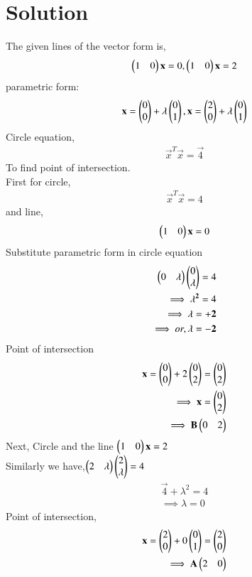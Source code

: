 \documentclass[journal,12pt,twocolumn]{IEEEtran}
\begin{document}
\section{Solution}
The given lines of the vector form is,
\begin{align}
\begin{pmatrix}1 & 0\end{pmatrix}\mathbf{x}=0,\begin{pmatrix}1 & 0\end{pmatrix}\mathbf{x}=2
\end{align}
parametric form:
\begin{align}
\mathbf{x}=\begin{pmatrix}0\\0\end{pmatrix}+\lambda \begin{pmatrix}0\\1\end{pmatrix},\mathbf{x}=\begin{pmatrix}2\\0\end{pmatrix}+\lambda \begin{pmatrix}0\\1\end{pmatrix}
\end{align}
Circle equation,
\begin{align}
\vec{x}^T\vec{x} = \vec{4}
\end{align}
To find point of intersection.
\\
First for circle,
\begin{align}
\vec{x}^T\vec{x}=4 
\end{align}
and line,
\begin{align}
\begin{pmatrix}1 & 0\end{pmatrix}\mathbf{x}=0
\end{align}
Substitute parametric form in circle equation
\begin{align}
\begin{pmatrix}0 & \lambda\end{pmatrix}\begin{pmatrix}0 \\ \lambda\end{pmatrix} =4
\\
\implies \mathbf{\lambda^2}=4
\\
\implies \mathbf{\lambda}=+\mathbf{2} 
\\
\implies or, \mathbf{\lambda}=-\mathbf{2}
\end{align}
 Point of intersection
\begin{align}
\mathbf{x}=\begin{pmatrix}0 \\0\end{pmatrix}+2\begin{pmatrix}0\\ 2\end{pmatrix}=\begin{pmatrix}0 \\ 2\end{pmatrix}
\\ 
\implies\mathbf{x}=\begin{pmatrix}0\\2\end{pmatrix}
\\
\implies \mathbf{B}\begin{pmatrix}0 & 2\end{pmatrix}
\end{align}
Next, Circle and the line $\begin{pmatrix}1 & 0\end{pmatrix}\mathbf{x}=2$
\\
Similarly we have,$\begin{pmatrix}2 & \lambda\end{pmatrix}\begin{pmatrix}2 \\ \lambda\end{pmatrix}=4$
\begin{align}
\vec{4}+\lambda^2= 4
\\
\implies \lambda=0
\end{align}
Point of intersection,
\begin{align}
 \mathbf{x}=\begin{pmatrix}2 \\0\end{pmatrix}+0\begin{pmatrix}0\\1\end{pmatrix}=\begin{pmatrix}2\\0\end{pmatrix}
 \\
 \implies \mathbf{A}\begin{pmatrix}2 & 0\end{pmatrix}
\end{align}
\end{document}
